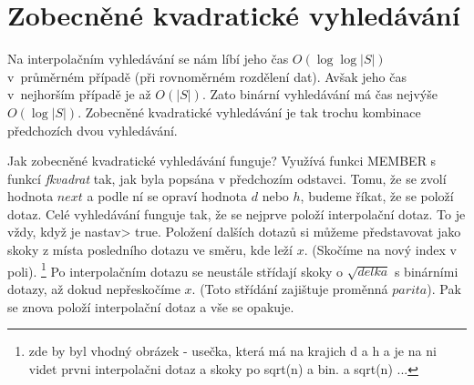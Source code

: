 
\section{Zobecněné kvadratické vyhledávání}

\def\xx{
Poznamka pro Martina:

Tak jak to dělal Koubek na přednášce. Jinak to tvoje zobecněné kv. v.
a kvadratické vyhledávání je to samé. Pavel Machek jen přejmenoval
některé proměnné a napsal to efektivneji, ale zase mene nazorneji a
je to vice obtizne na pochopeni. (je to jak v Ccku) Na druhou stranu
je to pekna ukazka, jak neco hezky naprogramovat. 
Ten jeho popis a zduvodneni casove slozitosti je nepresny - popisuje a
upocitava jiny jednodusi alg (kod ma spravny). Bylo by zajimave zjistit
jak se tyto dva alg. chovaji. Ten alg. co popisoval Koubek je taky dost 
podobny algoritmu jump search, kde se skace po odmocninach z n a uvadi se 
ze je dost rychly.
}


Na interpolačním vyhledávání se nám líbí jeho čas $O(\log\log |S|)$
v~průměrném případě (při rovnoměrném rozdělení dat). Avšak jeho čas 
v~nejhorším případě je až $O(|S|)$. Zato binární vyhledávání má čas
nejvýše $O(\log|S|)$. Zobecněné kvadratické vyhledávání je tak trochu 
kombinace předchozích dvou vyhledávání.


Jak zobecněné kvadratické vyhledávání funguje? 
Využívá funkci MEMBER s funkcí {\it fkvadrat} tak, jak byla popsána 
v předchozím odstavci. Tomu, že se zvolí hodnota $next$ a podle ní se 
opraví hodnota $d$ nebo $h$, budeme říkat, že se položí dotaz. 
Celé vyhledávání funguje tak, že se nejprve položí interpolační dotaz. 
To je vždy, když je \<nastav> true.
Položení dalších dotazů si můžeme představovat jako skoky z místa posledního dotazu
ve směru, kde leží $x$. (Skočíme na nový index v poli).
\footnote{
 zde by byl vhodný obrázek - usečka, která má na krajich d a h a je
 na ni videt prvni interpolačni dotaz a skoky po sqrt(n) a bin. a
 sqrt(n) ...
}
Po interpolačním dotazu se neustále střídají skoky o $\sqrt{delka}$ 
s binárními dotazy, až dokud nepřeskočíme $x$. 
(Toto střídání zajištuje proměnná $parita$).
Pak se znova položí interpolační dotaz a vše se opakuje.


